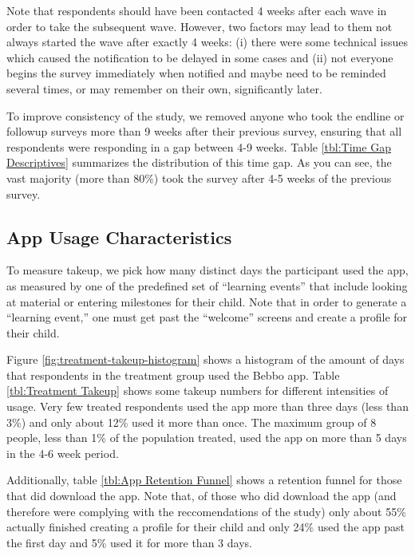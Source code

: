 \documentclass{article}
\begin{document}


Note that respondents should have been contacted 4 weeks after each wave in order to take the subsequent wave. However, two factors may lead to them not always started the wave after exactly 4 weeks: (i) there were some technical issues which caused the notification to be delayed in some cases and (ii) not everyone begins the survey immediately when notified and maybe need to be reminded several times, or may remember on their own, significantly later.

To improve consistency of the study, we removed anyone who took the endline or followup surveys more than 9 weeks after their previous survey, ensuring that all respondents were responding in a gap between 4-9 weeks. Table \ref{tbl:Time Gap Descriptives} summarizes the distribution of this time gap. As you can see, the vast majority (more than 80\%) took the survey after 4-5 weeks of the previous survey.



\subsection*{App Usage Characteristics}

To measure takeup, we pick how many distinct days the participant used the app, as measured by one of the predefined set of ``learning events'' that include looking at material or entering milestones for their child. Note that in order to generate a ``learning event,'' one must get past the ``welcome'' screens and create a profile for their child. 

Figure \ref{fig:treatment-takeup-histogram} shows a histogram of the amount of days that respondents in the treatment group used the Bebbo app. Table \ref{tbl:Treatment Takeup} shows some takeup numbers for different intensities of usage. Very few treated respondents used the app more than three days (less than 3\%) and only about 12\% used it more than once. The maximum group of 8 people, less than 1\% of the population treated, used the app on more than 5 days in the 4-6 week period.

Additionally, table \ref{tbl:App Retention Funnel} shows a retention funnel for those that did download the app. Note that, of those who did download the app (and therefore were complying with the reccomendations of the study) only about 55\% actually finished creating a profile for their child and only 24\% used the app past the first day and 5\% used it for more than 3 days. 
\end{document}
